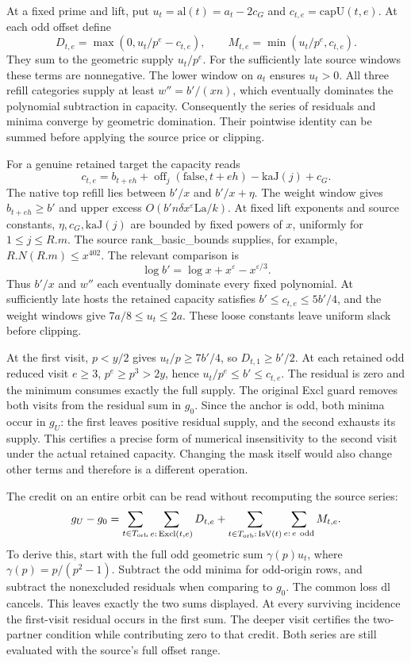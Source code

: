 \documentclass[12pt,letterpaper]{article}
\DeclareRobustCommand{\id}[1]{\mbox{\small\ttfamily #1}}
\begin{document}
At a fixed prime and lift, put \(u_t=\mathrm{al}(t)=a_t-2c_G\) and \(c_{t,e}=\mathrm{capU}(t,e)\). At each odd offset define
\[
 D_{t,e}=\max(0,u_t/p^e-c_{t,e}),\qquad
 M_{t,e}=\min(u_t/p^e,c_{t,e}).
\]
They sum to the geometric supply \(u_t/p^e\). For the sufficiently late source windows these terms are nonnegative. The lower window on \(a_t\) ensures \(u_t>0\). All three refill categories supply at least \(w''=b'/(xn)\), which eventually dominates the polynomial subtraction in capacity. Consequently the series of residuals and minima converge by geometric domination. Their pointwise identity can be summed before applying the source price or clipping.

For a genuine retained target the capacity reads
\[
 c_{t,e}=b_{t+eh}+\operatorname{off}_j(\mathrm{false},t+eh)
                              -\mathrm{kaJ}(j)+c_G.
\]
The native top refill lies between \(b'/x\) and \(b'/x+\eta\). The weight window gives \(b_{t+eh}\ge b'\) and upper excess \(O(b'n\delta x^\varepsilon\mathrm{La}/k)\). At fixed lift exponents and source constants, \(\eta,c_G,\mathrm{kaJ}(j)\) are bounded by fixed powers of \(x\), uniformly for \(1\le j\le R.m\). The source \id{rank\_basic\_bounds} supplies, for example, \(R.N(R.m)\le x^{402}\). The relevant comparison is
\[
          \log b'=\log x+x^\varepsilon-x^{\varepsilon/3}.
\]
Thus \(b'/x\) and \(w''\) each eventually dominate every fixed polynomial. At sufficiently late hosts the retained capacity satisfies \(b'\le c_{t,e}\le5b'/4\), and the weight windows give \(7a/8\le u_t\le2a\). These loose constants leave uniform slack before clipping.

At the first visit, \(p<y/2\) gives \(u_t/p\ge7b'/4\), so \(D_{t,1}\ge b'/2\). At each retained odd reduced visit \(e\ge3\), \(p^e\ge p^3>2y\), hence \(u_t/p^e\le b'\le c_{t,e}\). The residual is zero and the minimum consumes exactly the full supply. The original \id{Excl} guard removes both visits from the residual sum in \(g_0\). Since the anchor is odd, both minima occur in \(g_U\): the first leaves positive residual supply, and the second exhausts its supply. This certifies a precise form of numerical insensitivity to the second visit under the actual retained capacity. Changing the mask itself would also change other terms and therefore is a different operation.

The credit on an entire orbit can be read without recomputing the source series:
\begin{equation}
 g_U-g_0=
 \sum_{t\in T_{\rm orb}}\sum_{e:\,\mathrm{Excl}(t,e)}D_{t,e}
 +\sum_{t\in T_{\rm orb}:\,\mathrm{IsV}(t)}
                  \sum_{e:\,e\ {\rm odd}}M_{t,e}.
 \label{eq:gain-credit}
\end{equation}
To derive this, start with the full odd geometric sum \(\gamma(p)u_t\), where \(\gamma(p)=p/(p^2-1)\). Subtract the odd minima for odd-origin rows, and subtract the nonexcluded residuals when comparing to \(g_0\). The common loss \(\mathrm{dl}\) cancels. This leaves exactly the two sums displayed. At every surviving incidence the first-visit residual occurs in the first sum. The deeper visit certifies the two-partner condition while contributing zero to that credit. Both series are still evaluated with the source's full offset range.
\end{document}
